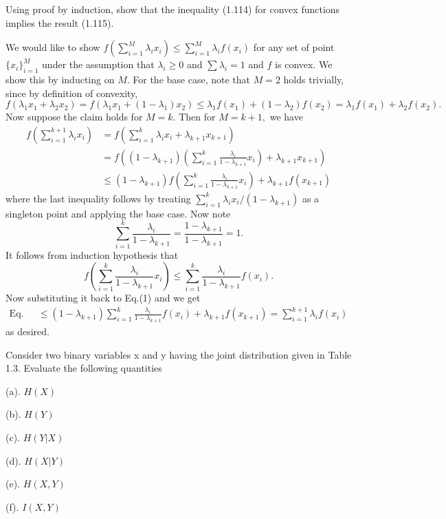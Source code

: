 \begin{cBoxA}{}
 Using proof by induction, show that the inequality (1.114) for convex
functions implies the result (1.115).
\end{cBoxA}

We would like to show $f(\sum_{i=1}^{M}\lambda_{i}x_{i})\leq\sum_{i=1}^{M}\lambda_{i}f(x_{i})$
for any set of point $\{x_{i}\}_{i=1}^{M}$ under the assumption that
$\lambda_{i}\geq0$ and $\sum\lambda_{i}=1$ and $f$ is convex. We
show this by inducting on $M$. For the base case, note that $M=2$
holds trivially, since by definition of convexity, 
\[
f(\lambda_{1}x_{1}+\lambda_{2}x_{2})=f(\lambda_{1}x_{1}+(1-\lambda_{1})x_{2})\leq\lambda_{1}f(x_{1})+(1-\lambda_{2})f(x_{2})=\lambda_{1}f(x_{1})+\lambda_{2}f(x_{2}).
\]
Now suppose the claim holds for $M=k.$ Then for $M=k+1,$ we have
\begin{align*}
f\left(\sum_{i=1}^{k+1}\lambda_{i}x_{i}\right) & =f\left(\sum_{i=1}^{k}\lambda_{i}x_{i}+\lambda_{k+1}x_{k+1}\right)\\
 & =f\left((1-\lambda_{k+1})\left(\sum_{i=1}^{k}\frac{\lambda_{i}}{1-\lambda_{k+1}}x_{i}\right)+\lambda_{k+1}x_{k+1}\right)\\
 & \leq(1-\lambda_{k+1})f\left(\sum_{i=1}^{k}\frac{\lambda_{i}}{1-\lambda_{k+1}}x_{i}\right)+\lambda_{k+1}f(x_{k+1})\tag{1}
\end{align*}
where the last inequality follows by treating $\sum_{i=1}^{k}\lambda_{i}x_{i}/(1-\lambda_{k+1})$
as a singleton point and applying the base case. Now note 
\[
\sum_{i=1}^{k}\frac{\lambda_{i}}{1-\lambda_{k+1}}=\frac{1-\lambda_{k+1}}{1-\lambda_{k+1}}=1.
\]
It follows from induction hypothesis that 
\[
f\left(\sum_{i=1}^{k}\frac{\lambda_{i}}{1-\lambda_{k+1}}x_{i}\right)\leq\sum_{i=1}^{k}\frac{\lambda_{i}}{1-\lambda_{k+1}}f(x_{i}).
\]
Now substituting it back to Eq.(1) and we get 
\begin{align*}
\text{Eq.(1)} & \leq(1-\lambda_{k+1})\sum_{i=1}^{k}\frac{\lambda_{i}}{1-\lambda_{k+1}}f(x_{i})+\lambda_{k+1}f(x_{k+1})=\sum_{i=1}^{k+1}\lambda_{i}f(x_{i})
\end{align*}
as desired. \\

\begin{cBoxA}{}
 Consider two binary variables x and y having the joint distribution
given in Table 1.3. Evaluate the following quantities 
\begin{multicols}{3}
 

(a). $H(X)$

(b). $H(Y)$

(c). $H(Y\vert X)$

(d). $H(X\vert Y)$

(e). $H(X,Y)$

(f). $I(X,Y)$
\end{multicols}
\end{cBoxA}

